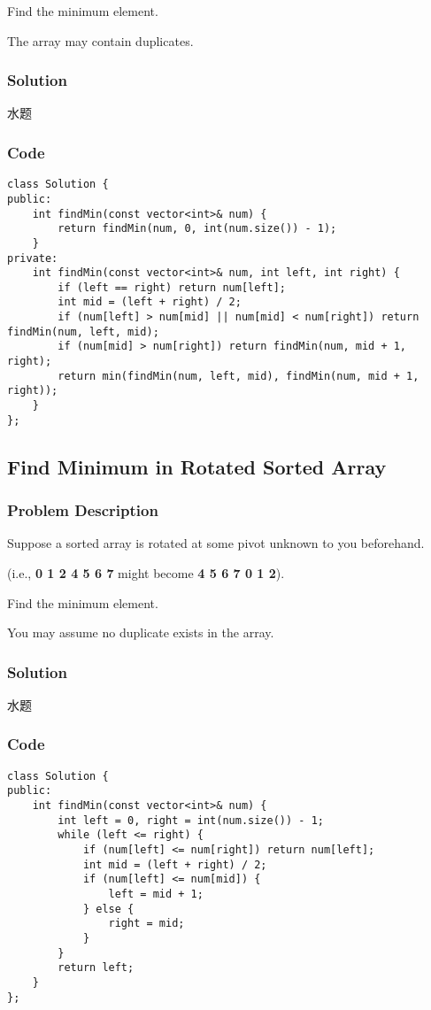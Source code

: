 \documentclass[courier]{article}
\begin{document}
\begin{CJK*}{UTF8}{gkai}
Find the minimum element.

The array may contain duplicates.



\subsubsection*{Solution}
水题

\subsubsection*{Code}
\begin{lstlisting}
class Solution {
public:
    int findMin(const vector<int>& num) {
        return findMin(num, 0, int(num.size()) - 1);
    }
private:
    int findMin(const vector<int>& num, int left, int right) {
        if (left == right) return num[left];
        int mid = (left + right) / 2;
        if (num[left] > num[mid] || num[mid] < num[right]) return findMin(num, left, mid);
        if (num[mid] > num[right]) return findMin(num, mid + 1, right);
        return min(findMin(num, left, mid), findMin(num, mid + 1, right));
    }
};

\end{lstlisting}


\subsection{ Find Minimum in Rotated Sorted Array }

\subsubsection*{Problem Description}
Suppose a sorted array is rotated at some pivot unknown to you beforehand.

(i.e., \textbf{0 1 2 4 5 6 7} might become \textbf{4 5 6 7 0 1 2}).

Find the minimum element.

You may assume no duplicate exists in the array.



\subsubsection*{Solution}
水题

\subsubsection*{Code}
\begin{lstlisting}
class Solution {
public:
    int findMin(const vector<int>& num) {
        int left = 0, right = int(num.size()) - 1;
        while (left <= right) {
            if (num[left] <= num[right]) return num[left];
            int mid = (left + right) / 2;
            if (num[left] <= num[mid]) {
                left = mid + 1;
            } else {
                right = mid;
            }
        }
        return left;
    }
}; 
\end{lstlisting}



\end{CJK*}
\end{document}
